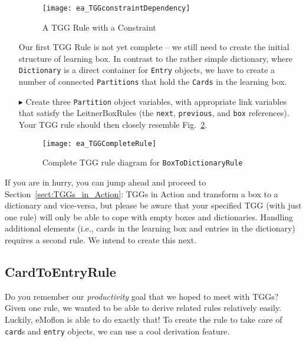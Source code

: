 \begin{enumerate}
\begin{figure}[h!]
\begin{center}
  \texttt{[image: ea\_TGGconstraintDependency]}
  \caption{A TGG Rule with a Constraint}
  \label{fig:tgg_rule_with_constraint}
  \end{center}
\end{figure}

\newpage

Our first TGG Rule is not yet complete -- we still need to create the initial structure of learning box. In contrast to the rather
simple dictionary, where \texttt{Dictionary} is a direct container for \texttt{Entry} objects, we have to create a number of connected \texttt{Partitions} that hold
the \texttt{Cards} in the learning box. 

\item[$\blacktriangleright$] Create three \texttt{Partition} object variables, with appropriate link variables that satisfy the LeitnerBoxRules (the
\texttt{next}, \texttt{previous}, and \texttt{box} references). Your TGG rule should then closely resemble Fig.~\ref{fig:boxtodictionaryrule_complete}.


\begin{figure}[htbp]
\begin{center}
  \texttt{[image: ea\_TGGCompleteRule]}
  \caption{Complete TGG rule diagram for \texttt{BoxToDictionaryRule}}
  \label{fig:boxtodictionaryrule_complete}
\end{center}
\end{figure}

\end{enumerate}


If you are in hurry, you can jump ahead and proceed to Section~\ref{sect:TGGs_in_Action}: TGGs in Action and transform a box to a dictionary and vice-versa, but
please be aware that your specified TGG (with just one rule) will only be able to cope with empty boxes and dictionaries. Handling additional elements
(i.e., cards in the learning box and entries in the dictionary) requires a second rule. We intend to create this next.

\newpage
\subsection{CardToEntryRule}

Do you remember our \emph{productivity} goal that we hoped to meet with TGGs? Given one rule, we wanted to be able to derive related rules relatively easily.
Luckily, eMoflon is able to do exactly that! To create the rule to take care of \texttt{card}s and \texttt{entry} objects, we can use a cool derivation
feature.

